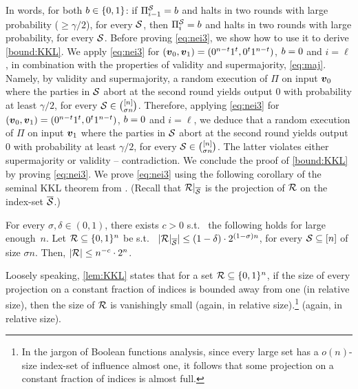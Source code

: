 \noindent
In words, for both $b\in \{0,1\}$: if $\Pi_{i-1}^{\mathcal{S}}=b$ and halts in two rounds with large probability ($\ge \gamma/2$), for every $\mathcal{S}$, then $\Pi_i^{\mathcal{S}}=b$ and halts in two rounds with large probability, for every $\mathcal{S}$.  Before proving \cref{eq:nei3}, we show how to use it to derive \cref{bound:KKL}. We apply \cref{eq:nei3} for $({ \boldsymbol{v}}_0,{ \boldsymbol{v}}_1)=(0^{n-t}1^{t}, 0^{t}1^{n-t})$, $b=0$ and $i=\ell$, in combination with the properties of validity and supermajority, \cref{eq:maj}. Namely, by validity and supermajority, a random execution of $\Pi$ on input ${ \boldsymbol{v}}_0$ where the parties in $\mathcal{S}$ abort at the second round yields output $0$ with probability at least $\gamma/2$, for every $\mathcal{S}\in {\binom{[n]}{\sigma n}}$. Therefore, applying \cref{eq:nei3} for $({ \boldsymbol{v}}_0,{ \boldsymbol{v}}_1)=(0^{n-t}1^{t}, 0^{t}1^{n-t})$, $b=0$ and $i=\ell$, we deduce that a random execution of $\Pi$ on input ${ \boldsymbol{v}}_1$ where the parties in $\mathcal{S}$ abort at the second round yields output $0$ with probability at least $\gamma/2$, for every $\mathcal{S}\in {\binom{[n]}{\sigma n}}$. The latter violates either supermajority or validity -- contradiction. We conclude the proof of \cref{bound:KKL} by proving \cref{eq:nei3}.
We prove \cref{eq:nei3} using the following  corollary of the seminal KKL theorem \cite{KKL88} from
\citet{BKK14}.
(Recall that $\mathcal{R}|_{\overline{\mathcal{S}}}$ is the projection of $\mathcal{R}$ on the index-set $\overline{\mathcal{S}}$.)

\ifdefined\IsFullVersion\else
\vspace{-.1cm}
\fi
\begin{lemma}\label{lem:KKL} For every $\sigma,  \delta\in (0,1)$, there exists $c>0$ s.t.\
the following holds for large enough~$n$. Let $\mathcal{R} \subseteq {\{0,1\}^n}$ be s.t.\
$|\mathcal{R}|_{\overline{\mathcal{S}}}|\le (1-\delta)\cdot 2^{(1-\sigma)n}$,  for every $\mathcal{S}\subseteq [n]$ of size $\sigma n$. Then,  $\left|\mathcal{R}\right|\le n^{-c}\cdot 2^n$.
\end{lemma}

\ifdefined\IsFullVersion\else
\vspace{-.1cm}
\fi
Loosely speaking, \cref{lem:KKL} states that for a set $\mathcal{R}\subseteq {\{0,1\}^n}$, if the size of every projection on a constant fraction of indices is bounded away from one (in relative size), then the size of $\mathcal{R}$ is vanishingly small
\ifdefined\IsFullVersion
(again, in relative size).\footnote{In the jargon of Boolean functions analysis, since every large set has a $o(n)$-size index-set of influence almost one, it follows that some projection on a constant fraction of indices is almost full.}
\else
(again, in relative size).
\fi









